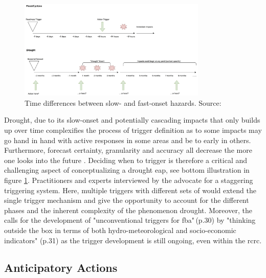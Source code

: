 \begin{figure}[!htp]
    \centering
    \includegraphics[width=0.8\textwidth]{figures/2023_MA_th_slow_onset.jpg}
    \decoRule
    \caption[Time differences between slow- and fast-onset hazards]{Time differences between slow- and fast-onset hazards. Source: \textcite{rcrcFORECASTBASEDFINANCINGEARLY2020}}
    \label{fig:th_slow_onset}
\end{figure}

Drought, due to its slow-onset and potentially cascading impacts that only builds up over time complexifies the process of trigger definition as  to some impacts may go hand in hand with active responses in some areas and be to early in others. Furthermore, forecast certainty, granularity and accuracy all decrease the more one looks into the future \autocite{rcrcFORECASTBASEDFINANCINGEARLY2020}. Deciding when to trigger is therefore a critical and challenging aspect of conceptualizing a drought \acrshort{eap}, see bottom illustration in figure \ref{fig:th_slow_onset}. Practitioners and experts interviewed by the \textcite{rcrcFORECASTBASEDFINANCINGEARLY2020} advocate for a staggering triggering system. Here, multiple triggers with different sets of  would extend the single trigger mechanism and give the opportunity to account for the different phases and the inherent complexity of the phenomenon drought. Moreover, the \textcite{rcrcFORECASTBASEDFINANCINGEARLY2020} calls for the development of "unconventional triggers for \acrfull{fba}"\,(p.30) by "thinking outside the box in terms of both hydro-meteorological and socio-economic indicators" (p.31) as the trigger development is still ongoing, even within the \acrshort{rcrc}.


\subsection{Anticipatory Actions}


